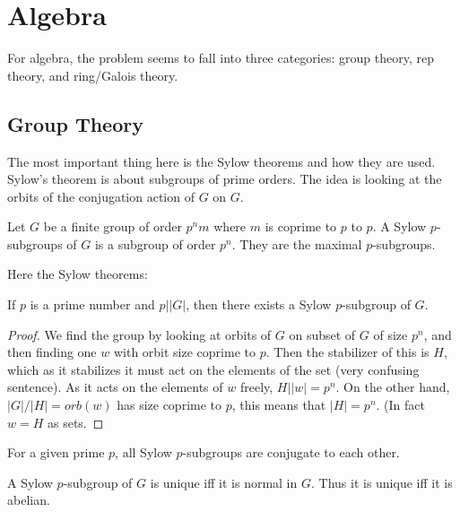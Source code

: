 \documentclass[main.tex]{subfiles}
\begin{document}
\section{Algebra}
For algebra, the problem seems to fall into three categories: group theory, rep theory, and ring/Galois theory.

\subsection{Group Theory}
The most important thing here is the Sylow theorems and how they are used. Sylow's theorem is about subgroups of prime orders. The idea is looking at the orbits of the conjugation action of $G$ on $G$.



\begin{definition}
Let $G$ be a finite group of order $p^n m$ where $m$ is coprime to $p$ to $p$. A Sylow $p$-subgroups of $G$ is a subgroup of order $p^n$. They are the maximal $p$-subgroups.
\end{definition}

Here the Sylow theorems:

\begin{theorem}
If $p$ is a prime number and $p | |G|$, then there exists a Sylow $p$-subgroup of $G$.
\end{theorem}

\begin{proof}
We find the group by looking at orbits of $G$ on subset of $G$ of size $p^n$, and then finding one $w$ with orbit size coprime to $p$. Then the stabilizer of this is $H$, which as it stabilizes it must act on the elements of the set (very confusing sentence). As it acts on the elements of $w$ freely, $H | |w| = p^n$. On the other hand, $|G|/|H| = orb(w)$ has size coprime to $p$, this means that $|H| = p^n$. (In fact $w = H$ as sets.
\end{proof}

\begin{theorem}
For a given prime $p$, all Sylow $p$-subgroups are conjugate to each other.
\end{theorem}

\begin{corollary}
A Sylow $p$-subgroup of $G$ is unique iff it is normal in $G$. Thus it is unique iff it is abelian.
\end{corollary}
\end{document}
